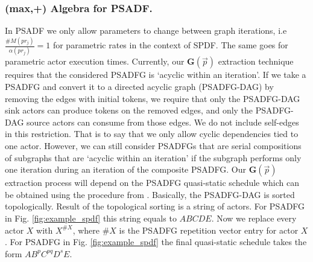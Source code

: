 \documentclass[]{eptcs}
\begin{document}
\subsubsection{(max,+) Algebra for PSADF.}
In PSADF we only allow parameters to change between graph iterations, i.e $\frac{\#M(pr_j)}{\alpha(pr_j)}=1$ for parametric rates in the context of SPDF. The same goes for parametric actor execution times. Currently, our $\mathbf{G}(\vec{p})$ extraction technique requires that the considered PSADFG is `acyclic within an iteration'. If we take a PSADFG and convert it to a directed acyclic graph (PSADFG-DAG) by removing the edges with initial tokens, we require that only the PSADFG-DAG sink actors can produce tokens on the removed edges, and only the PSADFG-DAG source actors can consume from those edges. We do not include self-edges in this restriction. That is to say that we only allow cyclic dependencies tied to one actor. However, we can still consider PSADFGs that are serial compositions of subgraphs that are `acyclic within an iteration' if the subgraph performs only one iteration during an iteration of the composite PSADFG. Our $\mathbf{G}(\vec{p})$ extraction process will depend on the PSADFG quasi-static schedule which can be obtained using the procedure from \cite{2frad:all}. Basically, the PSADFG-DAG is sorted topologically. Result of the topological sorting is a string of actors. For PSADFG in Fig. \ref{fig:example_spdf} this string equals to $\mathit{ABCDE}$. Now we replace every actor $X$ with $X^{\#X}$, where $\#X$ is the PSADFG repetition vector entry for actor $X$. For PSADFG in Fig. \ref{fig:example_spdf} the final quasi-static schedule takes the form $AB^pC^{pq}D^sE$.
\end{document}
